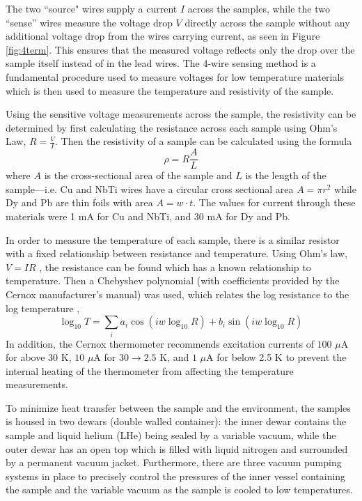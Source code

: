 \documentclass[prl,twocolumn,superscriptaddress,floatfix]{revtex4}
\begin{document}
The two ``source" wires supply a current $I$ across the samples,
while the two ``sense'' wires measure the voltage drop $V$ directly across the sample without any additional voltage drop from the wires carrying current, as seen in Figure \ref{fig:4term}.
This ensures that the measured voltage reflects only the drop over the sample itself instead of in the lead wires.
The 4-wire sensing method is a fundamental procedure used to measure voltages for low temperature materials which is 
then used to measure the temperature and resistivity of the sample.

Using the sensitive voltage measurements across the sample,  the resistivity can be determined by first
calculating the resistance across each sample using Ohm's Law, $R = \frac{V}{I}$. 
Then the resistivity of a sample can be calculated using the formula \begin{equation}
\rho = R\frac{A}{L}
\label{eq:resistivity}
\end{equation}
where $A$ is the cross-sectional area of the sample and $L$ is the length of the sample---i.e.
Cu and NbTi wires have a circular cross sectional area $A = \pi r^2$ while Dy and Pb are thin foils with area $A = w \cdot t$. The values for current through these materials were 1 mA for Cu and NbTi, and 30 mA for Dy and Pb.

In order to measure the temperature of each sample, there is a similar resistor with a fixed relationship between resistance and temperature. Using Ohm's law, $V=IR$ , the resistance can be found which has a known relationship to temperature. Then a Chebyshev polynomial (with coefficients provided by the Cernox manufacturer's manual) was used, which relates the log resistance to the log temperature \cite{manuel},
\begin{equation}
    \log_{10} T = \sum_{i} a_i \cos(iw \log_{10} R) + b_i \sin(iw \log_{10} R)
\label{calibrate}
\end{equation}
In addition, the Cernox thermometer recommends excitation currents of $100$ $\mu$A for above 30 K,
$10$ $\mu$A for $30 \to 2.5$ K,
and $1$ $\mu$A for below 2.5 K to prevent the internal heating of the thermometer from affecting the temperature measurements.

To minimize heat transfer between the sample and the environment, the samples is housed in two dewars (double walled container):
the inner dewar contains the sample and liquid helium (LHe) being sealed by a variable vacuum, while the outer dewar has an open top which is filled with liquid nitrogen and surrounded by a permanent vacuum jacket.
Furthermore, there are three vacuum pumping systems in place to precisely control the pressures of the inner vessel containing the sample and the variable vacuum as the sample is cooled to low temperatures. 
\end{document}
